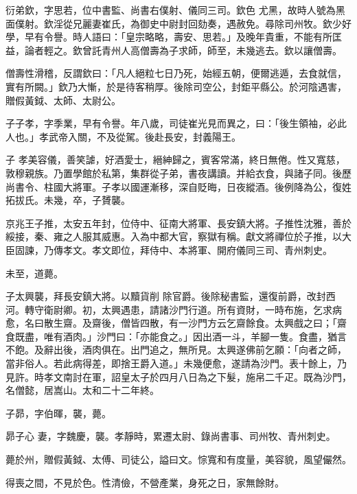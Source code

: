 \begin{pinyinscope}
 衍弟欽，字思若，位中書監、尚書右僕射、儀同三司。欽色
 尤黑，故時人號為黑面僕射。欽淫從兄麗妻崔氏，為御史中尉封回劾奏，遇赦免。尋除司州牧。欽少好學，早有令譽。時人語曰：「皇宗略略，壽安、思若。」及晚年貴重，不能有所匡益，論者輕之。欽曾託青州人高僧壽為子求師，師至，未幾逃去。欽以讓僧壽。



 僧壽性滑稽，反謂欽曰：「凡人絕粒七日乃死，始經五朝，便爾逃遁，去食就信，實有所闕。」欽乃大慚，於是待客稍厚。後除司空公，封鉅平縣公。於河陰遇害，贈假黃鉞、太師、太尉公。



 子子孝，字季業，早有令譽。年八歲，司徒崔光見而異之，曰：「後生領袖，必此人也。」孝武帝入關，不及從駕。後赴長安，封義陽王。



 子
 孝美容儀，善笑謔，好酒愛士，縉紳歸之，賓客常滿，終日無倦。性又寬慈，敦穆親族。乃置學館於私第，集群從子弟，書夜講讀。并給衣食，與諸子同。後歷尚書令、柱國大將軍。子孝以國運漸移，深自貶晦，日夜縱酒。後例降為公，復姓拓拔氏。未幾，卒，子贇襲。



 京兆王子推，太安五年封，位侍中、征南大將軍、長安鎮大將。子推性沈雅，善於綏接，秦、雍之人服其威惠。入為中都大官，察獄有稱。獻文將禪位於子推，以大臣固諫，乃傳孝文。孝文即位，拜侍中、本將軍、開府儀同三司、青州刺史。



 未至，道薨。



 子太興襲，拜長安鎮大將。以黷貨削
 除官爵。後除秘書監，還復前爵，改封西河。轉守衛尉卿。初，太興遇患，請諸沙門行道。所有資財，一時布施，乞求病愈，名曰散生齋。及齋後，僧皆四散，有一沙門方云乞齋餘食。太興戲之曰；「齋食既盡，唯有酒肉。」沙門曰：「亦能食之。」因出酒一斗，羊腳一隻。食盡，猶言不飽。及辭出後，酒肉俱在。出門追之，無所見。太興遂佛前乞願：「向者之師，當非俗人。若此病得差，即捨王爵入道。」未幾便愈，遂請為沙門。表十餘上，乃見許。時孝文南討在軍，詔皇太子於四月八日為之下髮，施帛二千疋。既為沙門，名僧懿，居嵩山。太和二十二年終。



 子昴，字伯暉，襲，薨。



 昴子心
 妻，字魏慶，襲。孝靜時，累遷太尉、錄尚書事、司州牧、青州刺史。



 薨於州，贈假黃鉞、太傅、司徒公，謚曰文。悰寬和有度量，美容貌，風望儼然。



 得喪之間，不見於色。性清儉，不營產業，身死之日，家無餘財。




\end{pinyinscope}
